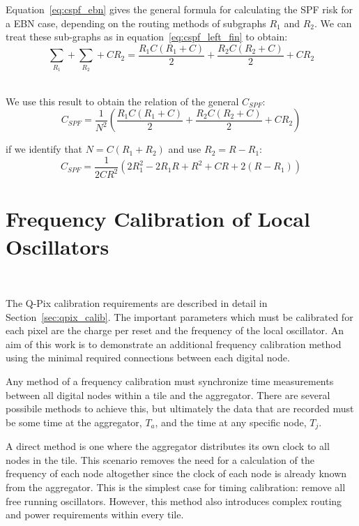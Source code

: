 Equation~\ref{eq:cspf_ebn} gives the general formula for calculating the SPF risk for a EBN case, depending on the routing methods of subgraphs $R_{1}$ and $R_{2}$.
We can treat these sub-graphs as in equation~\ref{eq:cspf_left_fin} to obtain:
\begin{equation}
  \sum_{R_{1}} + \sum_{R_{2}} + CR_{2} = \frac{R_{1}C(R_{1}+C)}{2} + \frac{R_{2}C(R_{2}+C)}{2} + CR_{2}
\end{equation}~\label{eq:cspf_e}

We use this result to obtain the relation of the general $C_{SPF}$:
\begin{equation}
  C_{SPF} = \frac{1}{N^{2}}(\frac{R_{1}C(R_{1}+C)}{2} + \frac{R_{2}C(R_{2}+C)}{2} + CR_{2})
\end{equation}

if we identify that $N = C(R_{1}+R_{2})$ and use $R_{2} = R - R_{1}$:
\begin{equation}
  C_{SPF} = \frac{1}{2CR^{2}}(2R_{1}^{2}-2R_{1}R+R^{2}+CR+2(R-R_{1}))
\end{equation}


\section{Frequency Calibration of Local Oscillators}~\label{sec:calib}

The Q-Pix calibration requirements are described in detail in Section~\ref{sec:qpix_calib}.
The important parameters which must be calibrated for each pixel are the charge per reset and the frequency of the local oscillator.
An aim of this work is to demonstrate an additional frequency calibration method using the minimal required connections between each digital node.

Any method of a frequency calibration must synchronize time measurements between all digital nodes within a tile and the aggregator.
There are several possibile methods to achieve this, but ultimately the data that are recorded must be some time at the aggregator, $T_{a}$, and the time at any specific node, $T_{j}$.

A direct method is one where the aggregator distributes its own clock to all nodes in the tile.
This scenario removes the need for a calculation of the frequency of each node altogether since the clock of each node is already known from the aggregator.
This is the simplest case for timing calibration: remove all free running oscillators.
However, this method also introduces complex routing and power requirements within every tile.

